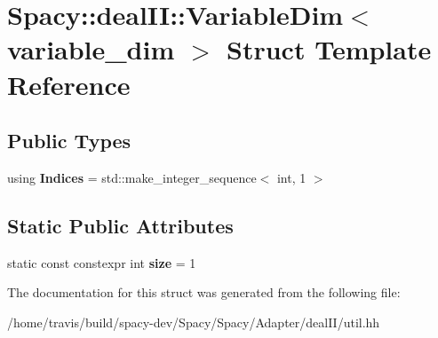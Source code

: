 \hypertarget{structSpacy_1_1dealII_1_1VariableDim_3_01variable__dim_01_4}{\section{Spacy\-:\-:deal\-I\-I\-:\-:Variable\-Dim$<$ variable\-\_\-dim $>$ Struct Template Reference}
\label{structSpacy_1_1dealII_1_1VariableDim_3_01variable__dim_01_4}
}
\subsection*{Public Types}
\begin{DoxyCompactItemize}
\item 
\hypertarget{structSpacy_1_1dealII_1_1VariableDim_3_01variable__dim_01_4_ad6760fb6f7e9a3ffc2af81d7120354dc}{using {\bfseries Indices} = std\-::make\-\_\-integer\-\_\-sequence$<$ int, 1 $>$}\label{structSpacy_1_1dealII_1_1VariableDim_3_01variable__dim_01_4_ad6760fb6f7e9a3ffc2af81d7120354dc}

\end{DoxyCompactItemize}
\subsection*{Static Public Attributes}
\begin{DoxyCompactItemize}
\item 
\hypertarget{structSpacy_1_1dealII_1_1VariableDim_3_01variable__dim_01_4_a7d09dc42b61ac31bf2b69c35535bf79c}{static const constexpr int {\bfseries size} = 1}\label{structSpacy_1_1dealII_1_1VariableDim_3_01variable__dim_01_4_a7d09dc42b61ac31bf2b69c35535bf79c}

\end{DoxyCompactItemize}


The documentation for this struct was generated from the following file\-:\begin{DoxyCompactItemize}
\item 
/home/travis/build/spacy-\/dev/\-Spacy/\-Spacy/\-Adapter/deal\-I\-I/util.\-hh\end{DoxyCompactItemize}

